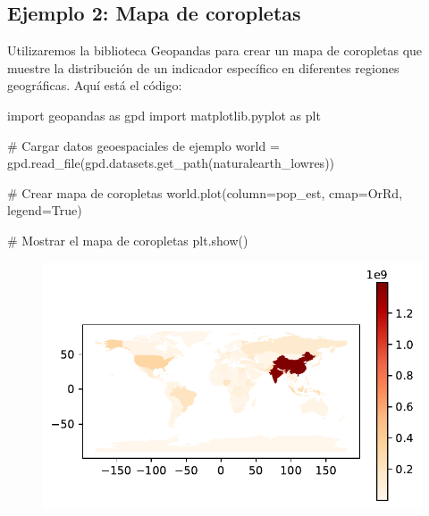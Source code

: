 \documentclass[
  a4paper,
]{article}
\newenvironment{Shaded}{}{}
\newcommand{\CommentTok}[1]{\textcolor[rgb]{0.42,0.45,0.49}{#1}}
\newcommand{\ImportTok}[1]{\textcolor[rgb]{0.01,0.18,0.38}{#1}}
\newcommand{\NormalTok}[1]{\textcolor[rgb]{0.14,0.16,0.18}{#1}}
\newcommand{\OperatorTok}[1]{\textcolor[rgb]{0.14,0.16,0.18}{#1}}
\newcommand{\StringTok}[1]{\textcolor[rgb]{0.01,0.18,0.38}{#1}}
\newcommand{\VariableTok}[1]{\textcolor[rgb]{0.89,0.38,0.04}{#1}}
\begin{document}
\hypertarget{ejemplo-2-mapa-de-coropletas}{%
\subsection{Ejemplo 2: Mapa de
coropletas}\label{ejemplo-2-mapa-de-coropletas}}

Utilizaremos la biblioteca Geopandas para crear un mapa de coropletas
que muestre la distribución de un indicador específico en diferentes
regiones geográficas. Aquí está el código:

\begin{Shaded}
\begin{Highlighting}[]
\ImportTok{import}\NormalTok{ geopandas }\ImportTok{as}\NormalTok{ gpd}
\ImportTok{import}\NormalTok{ matplotlib.pyplot }\ImportTok{as}\NormalTok{ plt}

\CommentTok{\# Cargar datos geoespaciales de ejemplo}
\NormalTok{world }\OperatorTok{=}\NormalTok{ gpd.read\_file(gpd.datasets.get\_path(}\StringTok{\textquotesingle{}naturalearth\_lowres\textquotesingle{}}\NormalTok{))}

\CommentTok{\# Crear mapa de coropletas}
\NormalTok{world.plot(column}\OperatorTok{=}\StringTok{\textquotesingle{}pop\_est\textquotesingle{}}\NormalTok{, cmap}\OperatorTok{=}\StringTok{\textquotesingle{}OrRd\textquotesingle{}}\NormalTok{, legend}\OperatorTok{=}\VariableTok{True}\NormalTok{)}

\CommentTok{\# Mostrar el mapa de coropletas}
\NormalTok{plt.show()}
\end{Highlighting}
\end{Shaded}

\begin{figure}[H]

{\centering \includegraphics{index_files/figure-pdf/cell-14-output-1.pdf}

}

\end{figure}
\end{document}
